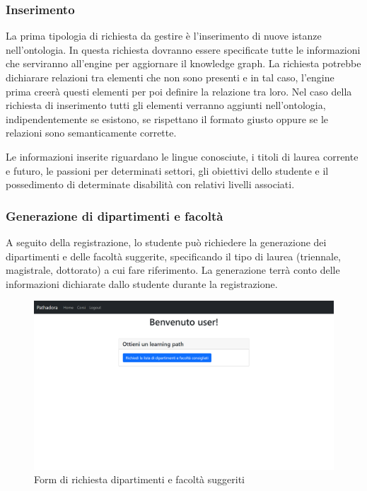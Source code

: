 \subsubsection{Inserimento}
La prima tipologia di richiesta da gestire è l’inserimento di nuove istanze nell'ontologia. In questa richiesta dovranno essere specificate tutte le informazioni che serviranno all’engine per aggiornare il knowledge graph. La richiesta potrebbe dichiarare relazioni tra elementi che non sono presenti e in tal caso, l’engine prima creerà questi elementi per poi definire la relazione tra
loro. Nel caso della richiesta di inserimento tutti gli elementi verranno aggiunti nell’ontologia, indipendentemente se esistono, se rispettano il formato giusto oppure se le relazioni sono semanticamente corrette.

Le informazioni inserite riguardano le lingue conosciute, i titoli di laurea corrente e futuro, le passioni per determinati settori, gli obiettivi dello studente e il possedimento di determinate disabilità con relativi livelli associati.

\subsubsection{Generazione di dipartimenti e facoltà}
A seguito della registrazione, lo studente può richiedere la generazione dei dipartimenti e delle facoltà suggerite, specificando il tipo di laurea (triennale, magistrale, dottorato) a cui fare riferimento. La generazione terrà conto delle informazioni dichiarate dallo studente durante la registrazione.

\begin{figure}[H]
\centering
\includegraphics[scale=0.4]{res/faculties-generation.png}
\caption{Form di richiesta dipartimenti e facoltà suggeriti}
\label{fig:faculties-generation}
\end{figure}

